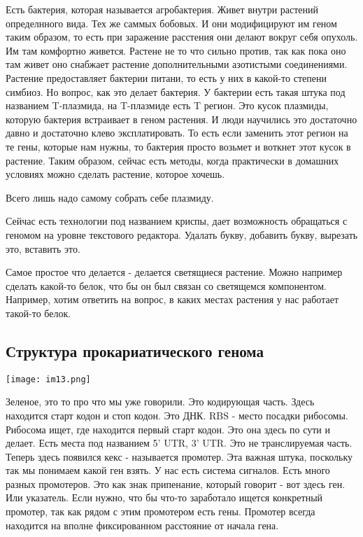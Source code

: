 Есть бактерия, которая называется агробактерия. Живет внутри 
растений определнного вида. Тех же 
саммых бобовых. И они модифицируют им геном таким образом, 
то есть при заражение расстения они делают вокруг 
себя опухоль. Им там комфортно живется. Растене
не то что сильно против, так как пока оно
там живет оно снабжает
растение дополнительными азотистыми соединениями. Растение
предоставляет бактерии питани, то есть
у них в какой-то степени симбиоз. Но вопрос, как это
делает бактерия. У бактерии есть
такая штука под названием T-плазмида, на T-плазмиде есть
T регион. Это кусок плазмиды, которую бактерия
встраивает в геном растения. И люди научились это
достаточно давно и достаточно клево эксплатировать. То есть
если заменить этот регион на те гены, которые нам нужны, то бактерия просто возьмет
и воткнет этот кусок в растение. Таким образом,
сейчас есть методы, когда практически в домашних условиях
можно сделать растение, которое хочешь.

Всего лишь надо самому собрать себе плазмиду.

Сейчас есть технологии под названием криспы, дает
возможность обращаться с геномом на уровне текстового редактора.
Удалать букву, добавить букву, вырезать это,
вставить это.

Самое простое что делается - делается
светящиеся растение. Можно например сделать
какой-то белок, что бы он был связан со светящемся
компонентом. Например, хотим
ответить на вопрос, в каких местах
растения у нас работает такой-то белок.


\subsection{Структура прокариатического генома}   
\texttt{[image: im13.png]}

Зеленое, это то про что 
мы уже говорили. Это кодирующая часть. Здесь 
находится старт кодон и стоп кодон. 
Это ДНК. RBS - место посадки рибосомы. Рибосома 
ищет, где находится первый старт кодон. Это она здесь по 
сути и делает. Есть места под
названием 5' UTR, 3' UTR. Это не транслируемая часть. 
Теперь здесь появился кекс - называется промотер. Эта 
важная штука, поскольку так мы понимаем какой ген взять. 
У нас есть система сигналов. Есть много разных 
промотеров. Это как знак припенание, который говорит - вот 
здесь ген. Или указатель. Если нужно, что бы 
что-то заработало ищется конкретный промотер, так
как рядом с этим промотером есть гены. Промотер 
всегда находится на вполне фиксированном расстояние от начала гена. 

